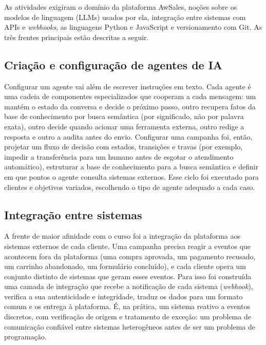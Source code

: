 \documentclass[12pt,a4paper,oneside]{article}
\begin{document}
As atividades exigiram o domínio da plataforma AwSales, noções sobre os modelos de linguagem (LLMs) usados por ela, integração entre sistemas com APIs e \textit{webhooks}, as linguagens Python e JavaScript e versionamento com Git. As três frentes principais estão descritas a seguir.

\subsection{Criação e configuração de agentes de IA}

Configurar um agente vai além de escrever instruções em texto. Cada agente é uma cadeia de componentes especializados que cooperam a cada mensagem: um mantém o estado da conversa e decide o próximo passo, outro recupera fatos da base de conhecimento por busca semântica (por significado, não por palavra exata), outro decide quando acionar uma ferramenta externa, outro redige a resposta e outro a audita antes do envio. Configurar uma campanha foi, então, projetar um fluxo de decisão com estados, transições e travas (por exemplo, impedir a transferência para um humano antes de esgotar o atendimento automático), estruturar a base de conhecimento para a busca semântica e definir em que pontos o agente consulta sistemas externos. Esse ciclo foi executado para clientes e objetivos variados, escolhendo o tipo de agente adequado a cada caso.

\subsection{Integração entre sistemas}

A frente de maior afinidade com o curso foi a integração da plataforma aos sistemas externos de cada cliente. Uma campanha precisa reagir a eventos que acontecem fora da plataforma (uma compra aprovada, um pagamento recusado, um carrinho abandonado, um formulário concluído), e cada cliente opera um conjunto distinto de sistemas que geram esses eventos. Para isso foi construída uma camada de integração que recebe a notificação de cada sistema (\textit{webhook}), verifica a sua autenticidade e integridade, traduz os dados para um formato comum e os entrega à plataforma. É, na prática, um sistema reativo a eventos discretos, com verificação de origem e tratamento de exceção: um problema de comunicação confiável entre sistemas heterogêneos antes de ser um problema de programação.
\end{document}
